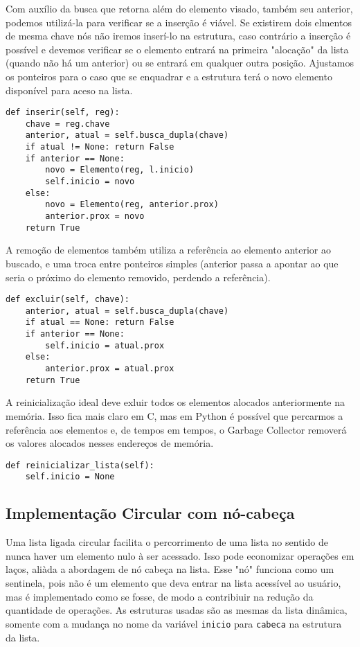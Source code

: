 \documentclass[a4paper, twocolumn]{article}
\theoremstyle{definition}
\begin{document}
Com auxílio da busca que retorna além do elemento visado, também seu anterior, podemos utilizá-la para verificar se a inserção é viável. Se existirem dois elmentos de mesma chave nós não iremos inserí-lo na estrutura, caso contrário a inserção é possível e devemos verificar se o elemento entrará na primeira "alocação" da lista (quando não há um anterior) ou se entrará em qualquer outra posição. Ajustamos os ponteiros para o caso que se enquadrar e a estrutura terá o novo elemento disponível para aceso na lista.

\begin{lstlisting}[label=lista_ligada_din_inserir, caption= Lista Ligada dinâmica (inserção)]
def inserir(self, reg):
    chave = reg.chave
    anterior, atual = self.busca_dupla(chave)
    if atual != None: return False
    if anterior == None:
        novo = Elemento(reg, l.inicio)
        self.inicio = novo
    else:
        novo = Elemento(reg, anterior.prox)
        anterior.prox = novo        
    return True
\end{lstlisting}

A remoção de elementos também utiliza a referência ao elemento anterior ao buscado, e uma troca entre ponteiros simples (anterior passa a apontar ao que seria o próximo do elemento removido, perdendo a referência).

\begin{lstlisting}[label=lista_ligada_din_excluir, caption= Lista Ligada dinâmica (remoção)]
def excluir(self, chave):
    anterior, atual = self.busca_dupla(chave)
    if atual == None: return False
    if anterior == None: 
        self.inicio = atual.prox
    else: 
        anterior.prox = atual.prox
    return True
\end{lstlisting}

A reinicialização ideal deve exluir todos os elementos alocados anteriormente na memória. Isso fica mais claro em C, mas em Python é possível que percarmos a referência aos elementos e, de tempos em tempos, o Garbage Collector removerá os valores alocados nesses endereços de memória.

\begin{lstlisting}[label=lista_ligada_din_reiniciar, caption= Lista Ligada dinâmica (reinicialização)]
def reinicializar_lista(self):
    self.inicio = None
\end{lstlisting}


\subsection{Implementação Circular com nó-cabeça}
Uma lista ligada circular facilita o percorrimento de uma lista no sentido de nunca haver um elemento nulo à ser acessado. Isso pode economizar operações em laços, aliàda a abordagem de nó cabeça na lista. Esse "nó" funciona como um sentinela, pois não é um elemento que deva entrar na lista acessível ao usuário, mas é implementado como se fosse, de modo a contribiuir na redução da quantidade de operações. As estruturas usadas são as mesmas da lista dinâmica, somente com a mudança no nome da variável \texttt{inicio} para \texttt{cabeca} na estrutura da lista.
\end{document}

